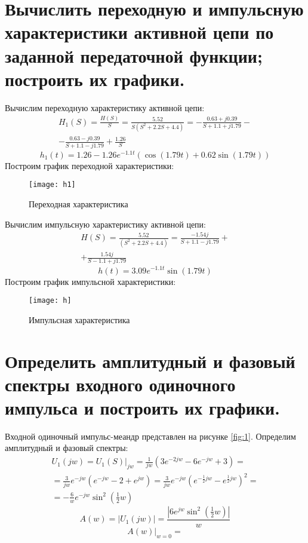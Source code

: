 \documentclass[a4paper,14pt ]{article} %
\begin{document}
    \section{Вычислить переходную и 
    импульсную характеристики активной цепи по
     заданной передаточной функции; построить их графики.}
    Вычислим переходную характеристику активной цепи:
    \begin{multline}
        H_1(S) = \frac{H(S)}{S}= \frac{5.52}{S(S^2 + 2.2S+ 4.4)} = 
        -\frac{0.63 + j0.39}{S+1.1 + j1.79} - \\ - \frac{0.63 - j0.39}{S + 1.1 - j1.79} + \frac{1.26}{S} 
    \end{multline}
    \begin{equation}
        h_1(t) = 1.26 - 1.26e^{-1.1t}(\cos(1.79t) + 0.62\sin(1.79t))
    \end{equation}
    Построим график переходной характеристики:
    \begin{figure}[H]
        \texttt{[image: h1]}
        \centering
        \caption{Переходная характеристика}
    \end{figure}
    Вычислим импульсную характеристику активной цепи:
    \begin{multline}
        H(S) = \frac{5.52}{(S^2 + 2.2S+ 4.4)} = \frac{-1.54j}{S + 1.1 - j1.79} + \\ 
        + \frac{1.54j}{S - 1.1 + j1.79}
    \end{multline}
    \begin{equation}
        h(t) = 3.09e^{-1.1t}\sin(1.79t)
    \end{equation}
    Построим график импульсной характеристики:
    \begin{figure}[H]
        \texttt{[image: h]}
        \centering
        \caption{Импульсная характеристика}
    \end{figure}
    \section{Определить амплитудный и фазовый спектры входного одиночного импульса и построить их графики.}
    Входной одиночный импульс-меандр представлен на рисунке \ref{fig:1}.
    Определим амплитудный и фазовый спектры:
    \begin{multline}
        U_1(jw) = U_1(S)|_{jw} = \frac{1}{jw}\left(3e^{-2jw} - 6e^{-jw} + 3\right) = \\ 
         = \frac{3}{jw}e^{-jw}(e^{-jw} - 2 + e^{jw}) = 
         \frac{3}{jw}e^{-jw}\left(e^{-\frac{1}{2}jw} - e^{\frac12jw}\right)^2 = \\
         = -\frac{6}{w}e^{-jw}\sin^2\left(\frac12w\right)
    \end{multline} 
    \begin{equation}
        A(w) = \left| U_1(jw)\right| = 
        \frac{|6e^{jw}\sin^2\left(\frac12w\right)
        |}{w} 
    \end{equation}
    \begin{equation*}
        A(w)|_{w=0}=
    \end{equation*}
\end{document}
